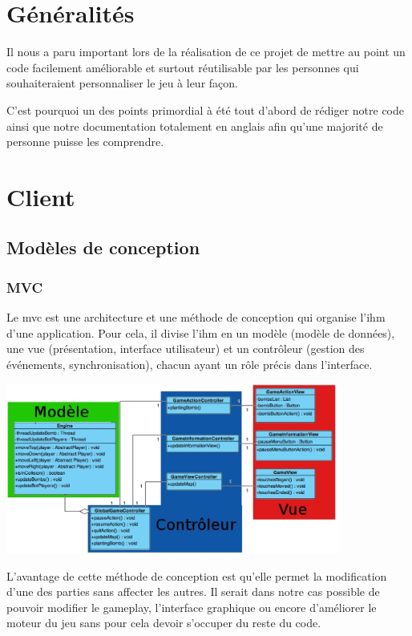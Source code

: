 \section{Généralités}

	Il nous a paru important lors de la réalisation de ce projet
	de mettre au point un code facilement améliorable et surtout
	réutilisable par les personnes qui souhaiteraient personnaliser
	le jeu à leur façon.
	
	C'est pourquoi un des points primordial à été tout d'abord de
	rédiger notre code ainsi que notre documentation totalement 
	en anglais afin qu'une majorité de personne puisse les comprendre.

\section{Client}

	\subsection{Modèles de conception}
	
		\subsubsection{MVC}
		
			Le \gls{mvc} est une architecture et une méthode de
			conception qui organise l'\gls{ihm} d'une 
			application.
			Pour cela, il divise l'\gls{ihm} en un modèle (modèle de données),
			une vue (présentation, interface utilisateur) et un contrôleur
			(gestion des événements, synchronisation), chacun ayant un rôle
			précis dans l'interface.
			
			\begin{center}
				\includegraphics[width=11cm]{./Reutilisabilite/Img/mvc.eps}
			\end{center} 
			
			L'avantage de cette méthode de conception est qu'elle permet la
			modification d'une des parties sans affecter les autres.
			Il serait dans notre cas possible de pouvoir modifier le gameplay,
			l'interface graphique ou encore d'améliorer le moteur du jeu sans pour
			cela devoir s'occuper du reste du code.		
		
